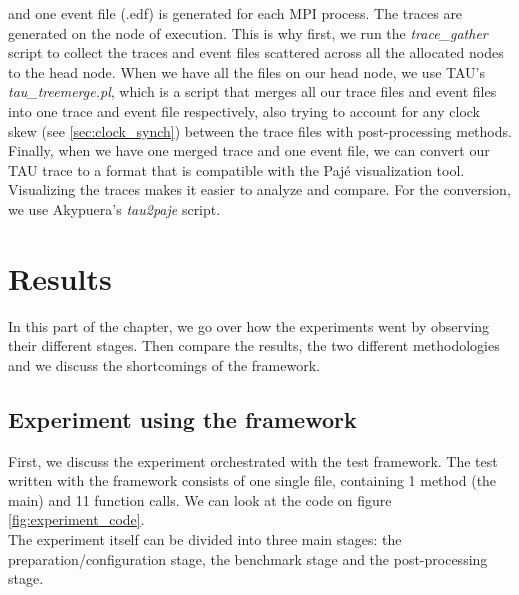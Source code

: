 and one event file (.edf) is generated for each MPI process. The
traces are generated on the node of execution. This is why first,
we run the \emph{trace\_gather}\cite{ms11} script to collect the traces
and event files scattered across all the allocated nodes to the head
node. When we have all the files on our head node, we use
TAU's \emph{tau\_treemerge.pl}, which is a script that merges all our
trace files and event files into one trace and event file
respectively, also trying to account for any clock skew
(see \ref{sec:clock_synch}) between the trace files with
post-processing methods. Finally, when we have one merged trace and
one event file, we can convert our TAU trace to a format that is
compatible with the Pajé\cite{cob00} visualization tool. Visualizing
the traces makes it easier to analyze and compare. For the conversion,
we use Akypuera's\cite{s13} \emph{tau2paje} script.\\[0.5cm]

\section{Results}
In this part of the chapter, we go over how the experiments went by
observing their different stages. Then compare the results, the
two different methodologies and we discuss the shortcomings of the
framework.
\subsection{Experiment using the framework}
First, we discuss the experiment orchestrated with the test
framework. The test written with the framework consists of one single
file, containing 1 method (the main) and 11 function calls. We can
look at the code on figure \ref{fig:experiment_code}.\\
The experiment itself can be divided into three main stages: the
preparation/configuration stage, the benchmark stage and the
post-processing stage.

